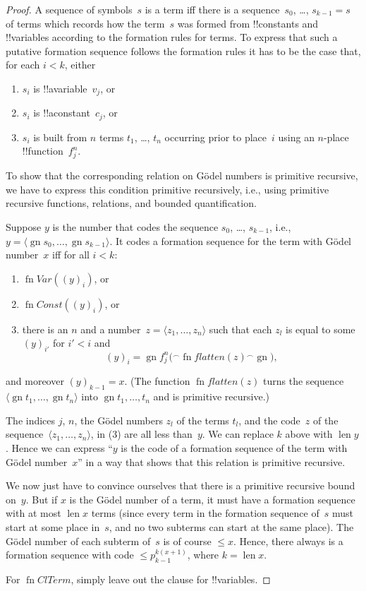 \documentclass[10pt,a4paper]{article}
\theoremstyle{plain}
\theoremstyle{definition}
\theoremstyle{remark}
\providecommand{\Obj}{}
\providecommand{\tuple}[1]{\langle #1 \rangle}
\providecommand{\len}{\operatorname{len}}
\providecommand{\concat}{\mathbin{{}^\frown}}
\providecommand{\Gn}{\operatorname{gn}}
\providecommand{\fn}{\operatorname{fn}}
\begin{document}
\begin{proof}
A sequence of symbols~$s$ is a term iff there is a sequence~$s_0$,
\dots, $s_{k-1} = s$ of terms which records how the term~$s$ was formed
from !!{constant}s and !!{variable}s according to the formation rules
for terms. To express that such a putative formation sequence follows
the formation rules it has to be the case that, for each $i < k$, either
\begin{enumerate}
\item $s_i$ is !!a{variable}~$\Obj v_j$, or
\item $s_i$ is !!a{constant}~$\Obj c_j$, or
\item $s_i$ is built from $n$ terms $t_1$, \dots, $t_n$ occurring
  prior to place~$i$ using an $n$-place !!{function}~$\Obj f^n_j$.
\end{enumerate}
To show that the corresponding relation on G\"odel numbers is
primitive recursive, we have to express this condition primitive
recursively, i.e., using primitive recursive functions, relations, and
bounded quantification.

Suppose $y$ is the number that codes the sequence $s_0$, \dots, $s_{k-1}$,
i.e., $y = \tuple{\Gn{s_0}, \dots, \Gn{s_{k-1}}}$.  It codes a formation
sequence for the term with G\"odel number~$x$ iff for all $i < k$:
\begin{enumerate}
\item $\fn{Var}((y)_i)$, or
\item $\fn{Const}((y)_i)$, or
\item there is an $n$ and a number~$z = \tuple{z_1, \dots, z_n}$ such
  that each $z_l$ is equal to some $(y)_{i'}$ for $i' < i$ and
\[
(y)_i = \Gn{\Obj f^n_j(} \concat \fn{flatten}(z) \concat \Gn{)},
\]
\end{enumerate}
and moreover $(y)_{k-1} = x$.  (The function $\fn{flatten}(z)$ turns
the sequence $\tuple{\Gn{t_1}, \dots, \Gn{t_n}}$ into $\Gn{t_1, \dots,
  t_n}$ and is primitive recursive.)

The indices $j$, $n$, the G\"odel numbers $z_l$ of the terms $t_l$,
and the code~$z$ of the sequence~$\tuple{z_1, \dots, z_n}$, in (3) are
all less than~$y$.  We can replace $k$ above with $\len{y}$.  Hence we
can express ``$y$ is the code of a formation sequence of the term with
G\"odel number~$x$'' in a way that shows that this relation is
primitive recursive.

We now just have to convince ourselves that there is a primitive
recursive bound on~$y$.  But if $x$ is the G\"odel number of a term,
it must have a formation sequence with at most $\len{x}$ terms (since
every term in the formation sequence of~$s$ must start at some place
in~$s$, and no two subterms can start at the same place).  The G\"odel
number of each subterm of~$s$ is of course $\le x$.  Hence, there
always is a formation sequence with code $\le p_{k-1}^{k(x+1)}$, where
$k=\len{x}$.

For $\fn{ClTerm}$, simply leave out the clause for !!{variable}s.
\end{proof}
\end{document}
